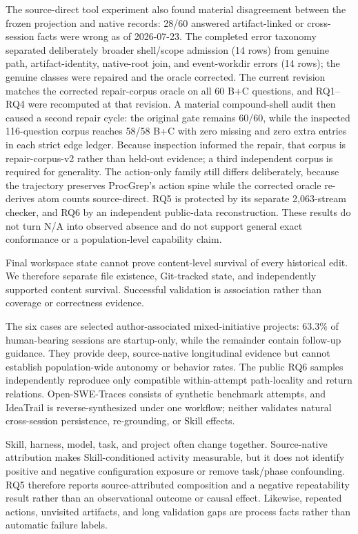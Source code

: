 \documentclass[letterpaper]{article}
\begin{document}
The source-direct tool experiment also found material disagreement between the
frozen projection and native records: 28/60 answered artifact-linked or
cross-session facts were wrong as of 2026-07-23.  The completed error taxonomy
separated deliberately broader shell/scope admission (14 rows) from genuine
path, artifact-identity, native-root join, and event-workdir errors (14 rows);
the genuine classes were repaired and the oracle corrected.  The current
revision matches the corrected repair-corpus oracle on all 60 B+C questions,
and RQ1--RQ4 were recomputed at that revision.  A material compound-shell audit
then caused a second repair cycle: the original gate remains 60/60, while the
inspected 116-question corpus reaches 58/58 B+C with zero missing and zero extra
entries in each strict edge ledger.  Because inspection informed the repair,
that corpus is repair-corpus-v2 rather than held-out evidence; a third
independent corpus is required for generality.  The action-only family still
differs deliberately, because the trajectory preserves ProcGrep's action spine
while the corrected oracle re-derives atom counts source-direct.  RQ5 is
protected by its separate 2,063-stream checker, and RQ6 by an independent
public-data reconstruction.  These results do not turn N/A into observed
absence and do not support general exact conformance or a population-level
capability claim.

Final workspace state cannot prove content-level survival of every historical
edit.  We therefore separate file existence, Git-tracked state, and independently
supported content survival.  Successful validation is association rather than
coverage or correctness evidence.

The six cases are selected author-associated mixed-initiative projects: 63.3\%
of human-bearing sessions are startup-only, while the remainder contain
follow-up guidance.  They provide deep, source-native longitudinal evidence
but cannot establish population-wide autonomy or behavior rates.  The public
RQ6 samples independently reproduce only compatible
within-attempt path-locality and return relations.  Open-SWE-Traces consists of
synthetic benchmark attempts, and IdeaTrail is reverse-synthesized under one
workflow; neither validates natural cross-session persistence, re-grounding,
or Skill effects.

Skill, harness, model, task, and project often change together.  Source-native
attribution makes Skill-conditioned activity measurable, but it does not
identify positive and negative configuration exposure or remove task/phase
confounding.  RQ5 therefore reports source-attributed composition and a
negative repeatability result rather than an observational outcome or causal
effect.  Likewise, repeated actions, unvisited artifacts, and long validation
gaps are process facts rather than automatic failure labels.
\end{document}
